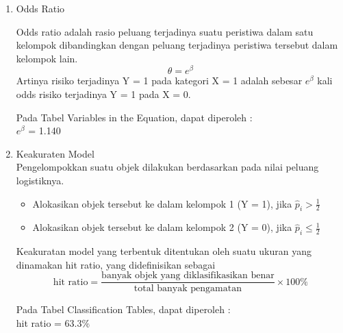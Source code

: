 \begin{enumerate}
\begin{test}
{\begin{enumerate}
        \item[-] Daerah Kritis \\
        $H_0$ ditolak jika $C > \chi_{\alpha, k}^2$ atau nilai sig $< \alpha$
    
        \item[-] Keputusan \\
        $H_0$ ditolak karena $GC > \chi_{\alpha, k}^2$, yaitu $14.132 > 12.592$
    
        \item[-] Kesimpulan \\
        Pada taraf signifikansi 5\%, $H_0$ ditolak sehingga model tidak sesuai (observasi dan prediksi berbeda).
    \end{enumerate}
    }
    \end{test}
    
    \item Odds Ratio
    \begin{sloppypar}
        Odds ratio adalah rasio peluang terjadinya suatu peristiwa dalam satu kelompok dibandingkan dengan peluang terjadinya peristiwa tersebut dalam kelompok lain. $$\theta = e^{\beta}$$
        Artinya risiko terjadinya Y = 1 pada kategori X = 1 adalah sebesar $e^{\beta}$ kali odds risiko terjadinya Y = 1 pada X = 0.
    \end{sloppypar}
    \begin{test}{
        Pada Tabel Variables in the Equation, dapat diperoleh : \\
        $e^{\beta}$ = 1.140
    }
    \end{test}
    
    \item Keakuraten Model
    \\Pengelompokkan suatu objek dilakukan berdasarkan pada nilai peluang logistiknya.
    \begin{itemize}
        \item Alokasikan objek tersebut ke dalam kelompok 1 (Y = 1), jika $\hat{p}_i > \frac{1}{2}$
        \item Alokasikan objek tersebut ke dalam kelompok 2 (Y = 0), jika $\hat{p}_i \leq \frac{1}{2}$
    \end{itemize}
    \begin{sloppypar}
        Keakuratan model yang terbentuk ditentukan oleh suatu ukuran yang dinamakan hit ratio, yang didefinisikan sebagai $$\text{hit ratio} = \frac{\text{banyak objek yang diklasifikasikan benar}}{\text{total banyak pengamatan}} \times 100\%$$
    \end{sloppypar}
    \begin{test}{
        Pada Tabel Classification Tables, dapat diperoleh : \\
        hit ratio = 63.3\%
    }
    \end{test}

\end{enumerate}
